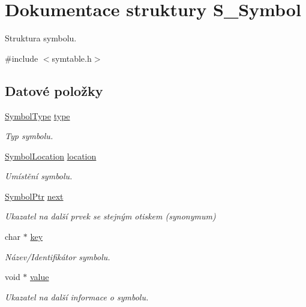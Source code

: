 \hypertarget{struct_s___symbol}{}\section{Dokumentace struktury S\+\_\+\+Symbol}
\label{struct_s___symbol}


Struktura symbolu.  




{\ttfamily \#include $<$symtable.\+h$>$}

\subsection*{Datové položky}
\begin{DoxyCompactItemize}
\item 
\hyperlink{symtable_8h_a623952f6aa67a355a3840e25272b1c91}{Symbol\+Type} \hyperlink{struct_s___symbol_afcd0853bc59ea24aeda931b253d456a6}{type}
\begin{DoxyCompactList}\small\item\em Typ symbolu. \end{DoxyCompactList}\item 
\hyperlink{symtable_8h_af810c55aa1b6968bd104b1babca10999}{Symbol\+Location} \hyperlink{struct_s___symbol_a07f3be77650617b18af2e0441d4b2cc2}{location}
\begin{DoxyCompactList}\small\item\em Umístění symbolu. \end{DoxyCompactList}\item 
\hyperlink{symtable_8h_ae75ae77f6060003cdcf7bd31d2c972f2}{Symbol\+Ptr} \hyperlink{struct_s___symbol_a6ff951b53c04f7b21152a91f52caaf32}{next}
\begin{DoxyCompactList}\small\item\em Ukazatel na další prvek se stejným otiskem (synonymum) \end{DoxyCompactList}\item 
char $\ast$ \hyperlink{struct_s___symbol_a5892a9181e6a332f84d27aecd41dcd12}{key}
\begin{DoxyCompactList}\small\item\em Název/\+Identifikátor symbolu. \end{DoxyCompactList}\item 
void $\ast$ \hyperlink{struct_s___symbol_a0f61d63b009d0880a89c843bd50d8d76}{value}
\begin{DoxyCompactList}\small\item\em Ukazatel na další informace o symbolu. \end{DoxyCompactList}\end{DoxyCompactItemize}


